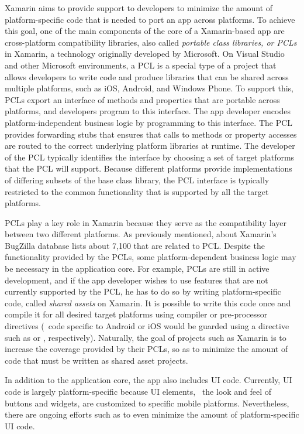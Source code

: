 Xamarin aims to provide support to developers to minimize the amount of
platform-specific code that is needed to port an app across platforms.  To
achieve this goal, one of the main components of the core of a Xamarin-based
app are cross-platform compatibility libraries, also called \textit{portable
class libraries, or PCLs} in Xamarin, a technology originally developed by
Microsoft. On Visual Studio and other Microsoft environments, a PCL is a
special type of a project that allows developers to write code and produce
libraries that can be shared across multiple platforms, such as iOS, Android,
and Windows Phone. To support this, PCLs export an interface of methods and
properties that are portable across platforms, and developers program to this
interface. The app developer encodes platform-independent business logic by
programming to this interface. The PCL provides forwarding stubs that ensures
that calls to methods or property accesses are routed to the correct underlying
platform libraries at runtime.  The developer of the PCL typically identifies
the interface by choosing a set of target platforms that the PCL will support.
Because different platforms provide implementations of differing subsets of the
base  class library, the PCL interface is typically restricted to
the common  functionality that is supported by all the target
platforms. 

PCLs play a key role in Xamarin because they serve as the compatibility layer
between two different platforms. As previously mentioned, about Xamarin's
BugZilla database lists about 7,100 that are related to PCL.  Despite the
functionality provided by the PCLs, some platform-dependent business logic may
be necessary in the application core.  For example, PCLs are still in active
development, and if the app developer wishes to use features that are not
currently supported by the PCL, he has to do so by writing platform-specific
code, called \textit{shared assets} on Xamarin. It is possible to write this
code once and compile it for all desired target platforms using compiler or
pre-processor directives (\eg~code specific to Android or iOS would be guarded
using a directive such as  or ,
respectively).  Naturally, the goal of projects such as Xamarin is to increase
the coverage provided by their PCLs, so as to minimize the amount of code that
must be written as shared asset projects.

In addition to the application core, the app also includes UI code. Currently,
UI code is largely platform-specific because UI elements, \eg~the look and feel
of buttons and widgets, are customized to specific mobile platforms.
Nevertheless, there are ongoing efforts such as  to even
minimize the amount of platform-specific UI code.

